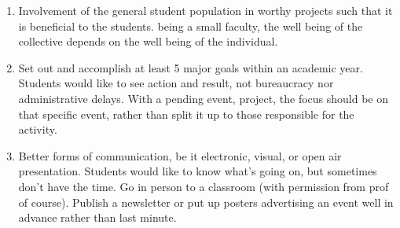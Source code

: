\begin{enumerate}
\def\labelenumi{\arabic{enumi}.}
\item
  Involvement of the general student population in worthy projects such
  that it is beneficial to the students. being a small faculty, the well
  being of the collective depends on the well being of the individual.
\item
  Set out and accomplish at least 5 major goals within an academic year.
  Students would like to see action and result, not bureaucracy nor
  administrative delays. With a pending event, project, the focus should
  be on that specific event, rather than split it up to those
  responsible for the activity.
\item
  Better forms of communication, be it electronic, visual, or open air
  presentation. Students would like to know what's going on, but
  sometimes don't have the time. Go in person to a classroom (with
  permission from prof of course). Publish a newsletter or put up
  posters advertising an event well in advance rather than last minute.
\end{enumerate}
